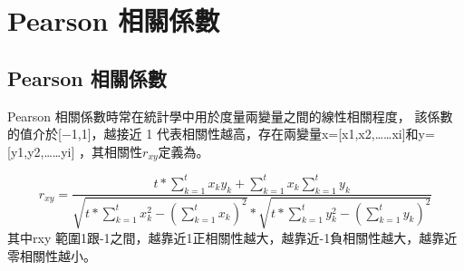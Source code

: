 \chapter{Pearson 相關係數}
\label{chapter:intro}
\section{Pearson 相關係數}
Pearson 相關係數時常在統計學中用於度量兩變量之間的線性相關程度， 該係數的值介於[−1,1]，越接近 1 代表相關性越高，存在兩變量x=[x1,x2,……xi]和y=[y1,y2,……yi] ，其相關性$r_{xy}$定義為。

\begin{equation}
\label{equ:Pearson }
    r_{xy}=\frac{t\ast \sum_{k=1}^{t}x_ky_k+\sum_{k=1}^{t}x_k\sum_{k=1}^{t}y_k}{\sqrt{t\ast \sum_{k=1}^{t}x_k^2-(\sum_{k=1}^{t}x_k)^2}\ast\sqrt{t\ast \sum_{k=1}^{t}y_k^2-(\sum_{k=1}^{t}y_k)^2}}
\end{equation}
其中rxy 範圍1跟-1之間，越靠近1正相關性越大，越靠近-1負相關性越大，越靠近零相關性越小。
    
